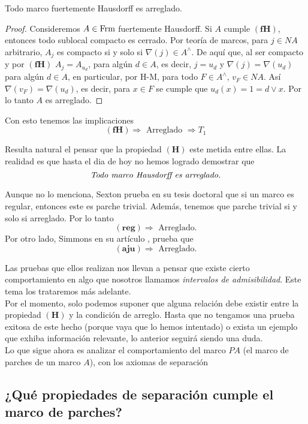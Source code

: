 \begin{lem}\label{TadyFHausdorff}
    Todo marco fuertemente Hausdorff es arreglado.
\end{lem}

\begin{proof}
    Consideremos $A\in \mathrm{Frm}$ fuertemente Hausdorff. Si $A$ cumple $\mathbf{(fH)}$, entonces todo sublocal compacto es cerrado. Por teoría de marcos, para $j\in NA$ arbitrario, $A_j$ es compacto si y solo si $\nabla(j)\in A^\wedge$. De aquí que, al ser compacto y por $\mathbf{(fH)}$ $A_j=A_{u_d}$, para algún $d\in A$, es decir, $j=u_d$ y $\nabla(j)=\nabla(u_d)$ para algún $d\in A$, en particular, por H-M, para todo $F\in A^\wedge$, $v_F\in NA$. Así $\nabla(v_F)=\nabla(u_d)$, es decir, para $x\in F$ se cumple que $u_d(x)=1=d\vee x$. Por lo tanto $A$ es arreglado.
\end{proof}

Con esto tenemos las implicaciones
\[
\mathbf{(fH)} \Rightarrow \mbox{ Arreglado }\Rightarrow T_1
\]

Resulta natural el pensar que la propiedad $\mathbf{(H)}$ este metida entre ellas. La realidad es que hasta el dia de hoy no hemos logrado demostrar que 
\[
\mbox{\emph{Todo marco Hausdorff es arreglado.}}
\]

Aunque no lo menciona, Sexton prueba en su tesis doctoral que si un marco es regular, entonces este es parche trivial. Además, tenemos que parche trivial si y solo si arreglado. Por lo tanto
\[
\mathbf{(reg)}\Rightarrow \mbox{ Arreglado.}
\] 
Por otro lado, Simmons en su artículo \cite{H.S.R}, prueba que 
\[
\mathbf{(aju)}\Rightarrow \mbox{ Arreglado.}
\]

Las pruebas que ellos realizan nos llevan a pensar que existe cierto comportamiento en algo que nosotros llamamos \emph{intervalos de admisibilidad}. Este tema los trataremos más adelante.\\

Por el momento, solo podemos suponer que alguna relación debe existir entre la propiedad $\mathbf{(H)}$ y la condición de arreglo. Hasta que no tengamos una prueba exitosa de este hecho (porque vaya que lo hemos intentado) o exista un ejemplo que exhiba información relevante,
lo anterior seguirá siendo una duda.\\

Lo que sigue ahora es analizar el comportamiento del marco $PA$ (el marco de parches de un marco $A$), con los axiomas de separación

\subsection{¿Qué propiedades de separación cumple el marco de parches?}\label{Parchesyseparación}

